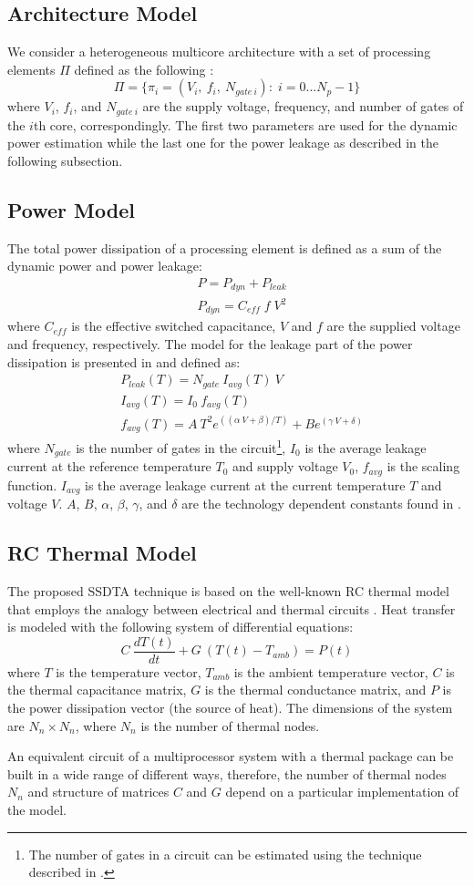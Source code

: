 \subsection{Architecture Model}
We consider a heterogeneous multicore architecture with a set of processing elements $\Pi$ defined as the following \cite{liao2005}:
\[
  \Pi = \{ \pi_i = (V_i, \: f_i, \: N_{gate \: i}): \; i = 0 \dots N_p - 1 \}
\]
where $V_i$, $f_i$, and $N_{gate \: i}$ are the supply voltage, frequency, and number of gates of the $i$th core, correspondingly. The first two parameters are used for the dynamic power estimation while the last one for the power leakage as described in the following subsection.

\subsection{Power Model}
The total power dissipation of a processing element is defined as a sum of the dynamic power and power leakage:
\begin{align*}
  & P = P_{dyn} + P_{leak} \\
  & P_{dyn} = C_{eff} \; f \; V^2
\end{align*}
where $C_{eff}$ is the effective switched capacitance, $V$ and $f$ are the supplied voltage and frequency, respectively. The model for the leakage part of the power dissipation is presented in \cite{liao2005} and defined as:
\begin{align*}
  & P_{leak}(T) = N_{gate} \: I_{avg}(T) \: V \\
  & I_{avg}(T) = I_0 \: f_{avg}(T) \\
  & f_{avg}(T) = A \: T^2 e^{((\alpha \: V + \beta)/T)} + B e^{(\gamma \: V + \delta)}
\end{align*}
where $N_{gate}$ is the number of gates in the circuit\footnote{The number of gates in a circuit can be estimated using the technique described in \cite{li2004}.}, $I_0$ is the average leakage current at the reference temperature $T_0$ and supply voltage $V_0$, $f_{avg}$ is the scaling function. $I_{avg}$ is the average leakage current at the current temperature $T$ and voltage $V$. $A$, $B$, $\alpha$, $\beta$, $\gamma$, and $\delta$ are the technology dependent constants found in \cite{liao2005}.

\subsection{RC Thermal Model}
The proposed SSDTA technique is based on the well-known RC thermal model that employs the analogy between electrical and thermal circuits \cite{kreith2000}. Heat transfer is modeled with the following system of differential equations:
\begin{equation} \label{eq:fourier-model}
  C \: \frac{dT(t)}{dt} + G \: (T(t) - T_{amb})= P(t)
\end{equation}
where $T$ is the temperature vector, $T_{amb}$ is the ambient temperature vector, $C$ is the thermal capacitance matrix, $G$ is the thermal conductance matrix, and $P$ is the power dissipation vector (the source of heat). The dimensions of the system are $N_n \times N_n$, where $N_n$ is the number of thermal nodes.

An equivalent circuit of a multiprocessor system with a thermal package can be built in a wide range of different ways, therefore, the number of thermal nodes $N_n$ and structure of matrices $C$ and $G$ depend on a particular implementation of the model.
